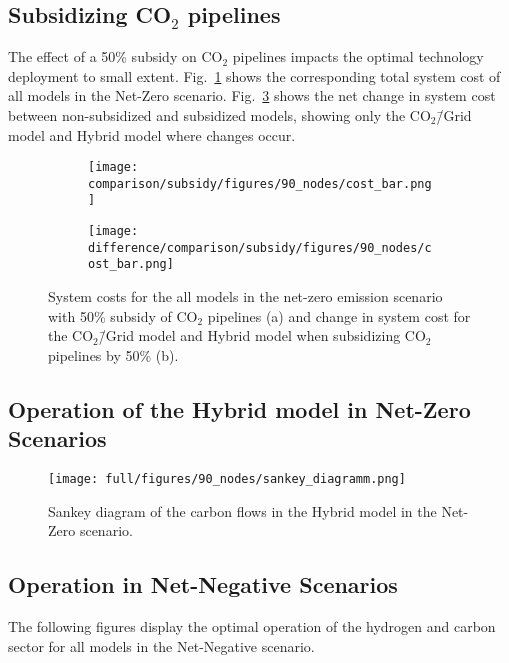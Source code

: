 \documentclass[twocolumn]{article}
\newcommand{\carbon}{CO$_2$}
\newcommand{\carbonmodel}{CO$_2$\=/Grid model}
\newcommand{\hybridmodel}{Hybrid model}
\begin{document}
\clearpage
\subsection{Subsidizing \carbon{} pipelines}

The effect of a 50\% subsidy on \carbon{} pipelines impacts the optimal technology deployment to small extent. Fig.~\ref{fig:cost_bar_subsidy} shows the corresponding total system cost of all models in the Net-Zero scenario. Fig.~\ref{fig:cost_bar_diff_subsidy} shows the net change in system cost between non-subsidized and subsidized models, showing only the \carbonmodel{} and \hybridmodel{} where changes occur.

\begin{figure}[ht!]
    \centering
    \begin{subfigure}{.5\textwidth}
    \texttt{[image: comparison/subsidy/figures/90\_nodes/cost\_bar.png]}
    \caption{}
    \label{fig:cost_bar_subsidy}
\end{subfigure}%
\begin{subfigure}{.5\textwidth}
    \centering
    \texttt{[image: difference/comparison/subsidy/figures/90\_nodes/cost\_bar.png]}
    \caption{}
    \label{fig:cost_bar_diff_subsidy}
\end{subfigure}
\caption{System costs for the all models in the net-zero emission scenario with 50\% subsidy of \carbon{} pipelines (a) and change in system cost for the \carbonmodel{} and \hybridmodel{} when subsidizing \carbon{} pipelines by 50\% (b).}
\end{figure}


\clearpage
\subsection{Operation of the \hybridmodel{} in Net-Zero Scenarios}

\begin{figure}
    \centering
    \texttt{[image: full/figures/90\_nodes/sankey\_diagramm.png]}
    \caption{Sankey diagram of the carbon flows in the \hybridmodel{} in the Net-Zero scenario.}
    \label{fig:sankey_diagramm}
\end{figure}



\clearpage
\subsection{Operation in Net-Negative Scenarios}
The following figures display the optimal operation of the hydrogen and carbon sector for all models in the Net-Negative scenario.
\end{document}
